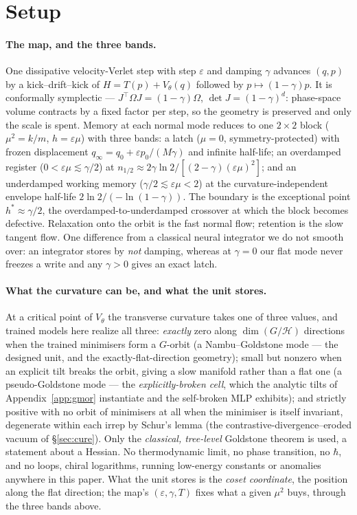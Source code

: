 \documentclass{article}
\begin{document}
\section{Setup}\label{sec:setup}

\paragraph{The map, and the three bands.} One dissipative velocity-Verlet step with step $\varepsilon$ and damping $\gamma$ advances $(q,p)$ by a kick--drift--kick of $H=T(p)+V_\theta(q)$ followed by $p\mapsto(1-\gamma)p$. It is conformally symplectic --- $J^\top\Omega J=(1-\gamma)\Omega$, $\det J=(1-\gamma)^d$: phase-space volume contracts by a fixed factor per step, so the geometry is preserved and only the scale is spent. Memory at each normal mode reduces to one $2\times2$ block ($\mu^2=k/m$, $h=\varepsilon\mu$) with three bands: a latch ($\mu=0$, symmetry-protected) with frozen displacement $q_\infty=q_0+\varepsilon p_0/(M\gamma)$ and infinite half-life; an overdamped register ($0<\varepsilon\mu\lesssim\gamma/2$) at $n_{1/2}\approx2\gamma\ln2/[(2-\gamma)(\varepsilon\mu)^2]$; and an underdamped working memory ($\gamma/2\lesssim\varepsilon\mu<2$) at the curvature-independent envelope half-life $2\ln2/(-\ln(1-\gamma))$. The boundary is the exceptional point $h^*\approx\gamma/2$, the overdamped-to-underdamped crossover at which the block becomes defective. Relaxation onto the orbit is the fast normal flow; retention is the slow tangent flow. One difference from a classical neural integrator we do not smooth over: an integrator stores by \emph{not} damping, whereas at $\gamma=0$ our flat mode never freezes a write and any $\gamma>0$ gives an exact latch.

\paragraph{What the curvature can be, and what the unit stores.} At a critical point of $V_\theta$ the transverse curvature takes one of three values, and trained models here realize all three: \emph{exactly} zero along $\dim(G/\mathcal H)$ directions when the trained minimisers form a $G$-orbit (a Nambu--Goldstone mode --- the designed unit, and the exactly-flat-direction geometry); small but nonzero when an explicit tilt breaks the orbit, giving a slow manifold rather than a flat one (a pseudo-Goldstone mode --- the \emph{explicitly-broken cell}, which the analytic tilts of Appendix~\ref{app:gmor} instantiate and the self-broken MLP exhibits); and strictly positive with no orbit of minimisers at all when the minimiser is itself invariant, degenerate within each irrep by Schur's lemma (the contrastive-divergence--eroded vacuum of \S\ref{sec:cure}). Only the \emph{classical, tree-level} Goldstone theorem is used, a statement about a Hessian. No thermodynamic limit, no phase transition, no $\hbar$, and no loops, chiral logarithms, running low-energy constants or anomalies anywhere in this paper. What the unit stores is the \emph{coset coordinate}, the position along the flat direction; the map's $(\varepsilon,\gamma,T)$ fixes what a given $\mu^2$ buys, through the three bands above.
\end{document}

